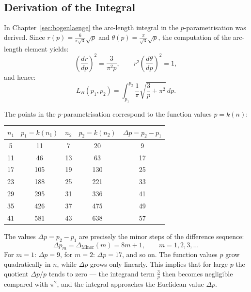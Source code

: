 \subsection{Derivation of the Integral}

In Chapter~\ref{sec:bogenlaenge} the arc-length integral in the
$p$-parametrisation was derived. Since $r(p) = \frac{6}{\pi\sqrt{3}}\sqrt{p}$ and
$\theta(p) = \frac{\pi}{\sqrt{3}}\sqrt{p}$, the computation of the
arc-length element yields:
\[
\left(\frac{dr}{dp}\right)^2 = \frac{3}{\pi^2 p},
\qquad
r^2\!\left(\frac{d\theta}{dp}\right)^2 = 1,
\]
and hence:
\begin{equation}
\label{eq:bogenlaenge_p}
L_B(p_1, p_2)
= \int_{p_1}^{p_2}
  \frac{1}{\pi}\sqrt{\frac{3}{p} + \pi^2}\,dp.
\end{equation}

The points in the $p$-parametrisation correspond to the function values
$p = k(n)$:

\begin{center}
\begin{tabular}{ccccc}
\toprule
$n_1$ & $p_1 = k(n_1)$ & $n_2$ & $p_2 = k(n_2)$ & $\Delta p = p_2 - p_1$ \\
\midrule
 5 & 11  &  7 & 20  & 9  \\
11 & 46  & 13 & 63  & 17 \\
17 & 105 & 19 & 130 & 25 \\
23 & 188 & 25 & 221 & 33 \\
29 & 295 & 31 & 336 & 41 \\
35 & 426 & 37 & 475 & 49 \\
41 & 581 & 43 & 638 & 57 \\
\bottomrule
\end{tabular}
\end{center}

\begin{remark}
The values $\Delta p = p_2 - p_1$ are precisely the minor steps of the
difference sequence:
\[
\Delta p_m = \Delta_{\mathrm{Minor}}(m) = 8m + 1, \qquad m = 1, 2, 3, \ldots
\]
For $m=1$: $\Delta p = 9$, for $m=2$: $\Delta p = 17$, and so on.
The function values $p$ grow quadratically in $n$, while $\Delta p$
grows only linearly. This implies that for large $p$ the quotient
$\Delta p / p$ tends to zero --- the integrand term $\frac{3}{p}$ then
becomes negligible compared with $\pi^2$, and the integral approaches the
Euclidean value $\Delta p$.
\end{remark}

